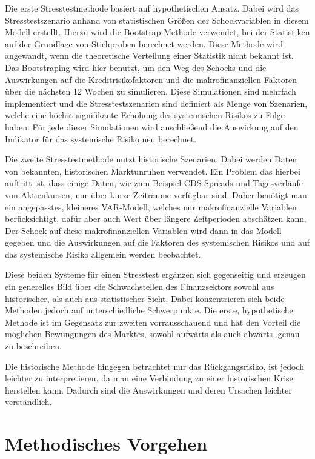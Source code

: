\documentclass[a4paper,12pt]{scrartcl}
\begin{document}
Die erste Stresstestmethode basiert auf hypothetischen Ansatz. Dabei wird das Stresstestszenario anhand von statistischen Größen der Schockvariablen in diesem Modell erstellt. Hierzu wird die Bootstrap-Methode verwendet, bei der Statistiken auf der Grundlage von Stichproben berechnet werden. Diese Methode wird angewandt, wenn die theoretische Verteilung einer Statistik nicht bekannt ist.
Das Bootstraping wird hier benutzt, um den Weg des Schocks und die Auswirkungen auf die Kreditrisikofaktoren und die makrofinanziellen Faktoren  über die nächsten 12 Wochen zu simulieren. 
Diese Simulationen sind mehrfach implementiert und die Stresstestszenarien sind definiert als Menge von Szenarien, welche eine höchst signifikante Erhöhung des systemischen Risikos zu Folge haben.
Für jede dieser Simulationen wird anschließend die Auswirkung auf den Indikator für das systemische Risiko neu berechnet. 

Die zweite Stresstestmethode nutzt historische Szenarien. Dabei werden Daten von bekannten, historischen Marktunruhen verwendet. Ein Problem das hierbei auftritt ist, dass einige Daten, wie zum Beispiel CDS Spreads und Tagesverläufe von Aktienkursen, nur über kurze Zeiträume verfügbar sind. Daher benötigt man ein angepasstes, kleineres VAR-Modell, welches nur makrofinanzielle Variablen berücksichtigt, dafür aber auch Wert über längere Zeitperioden abschätzen kann.
Der Schock auf diese makrofinanziellen Variablen wird dann in das Modell gegeben und die Auswirkungen auf die Faktoren des systemischen Risikos und auf das systemische Risiko allgemein werden beobachtet.

Diese beiden Systeme für einen Stresstest ergänzen sich gegenseitig und erzeugen ein generelles Bild über die Schwachstellen des Finanzsektors sowohl aus historischer, als auch aus statistischer Sicht. Dabei konzentrieren sich beide Methoden jedoch auf unterschiedliche Schwerpunkte.
Die erste, hypothetische Methode ist im Gegensatz zur zweiten vorrausschauend und hat den Vorteil die möglichen Bewungungen des Marktes, sowohl aufwärts als auch abwärts, genau zu beschreiben. 

Die historische Methode hingegen betrachtet nur das Rückgangsrisiko, ist jedoch leichter zu interpretieren, da man eine Verbindung zu einer historischen Krise herstellen kann. Dadurch sind die Auswirkungen und deren Ursachen leichter verständlich.
\newpage
\section{Methodisches Vorgehen}
\end{document}
